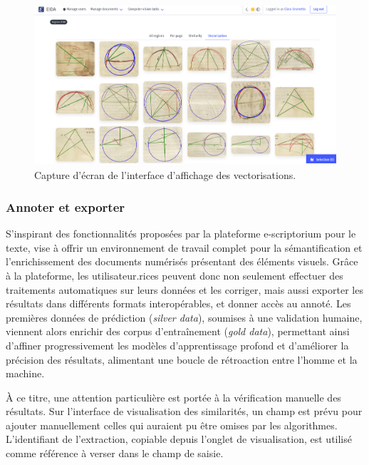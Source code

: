\begin{figure}[H]
          \begin{center}
          \includegraphics[height=6cm]{figues/vecto_interface.png}
          \end{center}
          \caption{Capture d'écran de l'interface d'affichage des vectorisations.}
          \label{fig:vecto_interface} \end{figure}

\hypertarget{annoter-et-exporter}{%
\subsubsection{Annoter et exporter}\label{annoter-et-exporter}}

S'inspirant des fonctionnalités proposées par la plateforme
e-scriptorium pour le texte, \aikon vise à offrir un environnement de
travail complet pour la sémantification et l'enrichissement des
documents numérisés présentant des éléments visuels. Grâce à la
plateforme, les utilisateur.rices peuvent donc non seulement effectuer des
traitements automatiques sur leurs données et les corriger, mais aussi
exporter les résultats dans différents formats interopérables, et donner
accès au \man \iiif annoté. Les premières données de prédiction
(\emph{silver data}), soumises à une validation humaine, viennent alors
enrichir des corpus d'entraînement (\emph{gold data}), permettant ainsi
d'affiner progressivement les modèles d'apprentissage profond et
d'améliorer la précision des résultats, alimentant une boucle de
rétroaction entre l'homme et la machine.

À ce titre, une attention particulière est portée à la vérification
manuelle des résultats. Sur l'interface de visualisation des similarités,
un champ est prévu pour ajouter manuellement celles qui auraient pu être
omises par les algorithmes. L'identifiant de l'extraction, copiable
depuis l'onglet de visualisation, est utilisé comme référence à verser
dans le champ de saisie.

